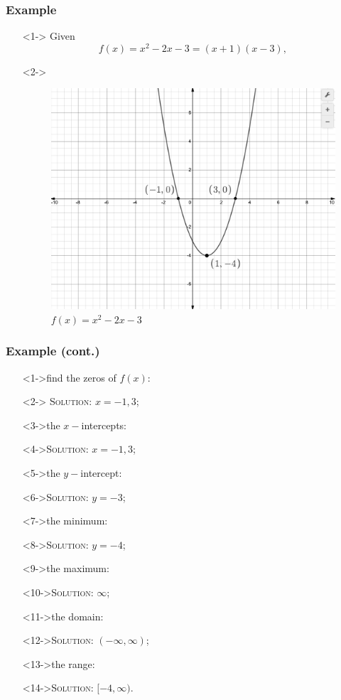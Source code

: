 \documentclass{beamer}
\begin{document}
\begin{frame}
	\frametitle{Example} 
	\begin{enumerate} 
		\item[]<1-> Given 
		\[
			f(x)=x^{2}-2x-3=(x+1)(x-3), 
		\]
		\item[]<2-> 
		\begin{figure} 
			\begin{center}
				\caption{$f(x)=x^{2}-2x-3$}
				\includegraphics[scale=0.2]{4_1_025.png} 	 	
			\end{center} 
		\end{figure} 
	\end{enumerate}
\end{frame}

\begin{frame}
	\frametitle{Example (cont.)} 
		\begin{enumerate}
			\item[]<1->find the zeros of $f(x)$: 
			\item[]<2-> \textsc{Solution:} $x=-1, 3$; 
			\item[]<3->the $x-$intercepts: 
			\item[]<4->\textsc{Solution:} $x=-1, 3$;  
			\item[]<5->the $y-$intercept: 
			\item[]<6->\textsc{Solution:} $y=-3$;  
			\item[]<7->the minimum:  
			\item[]<8->\textsc{Solution:} $y=-4$;  
			\item[]<9->the maximum: 
			\item[]<10->\textsc{Solution:} $\infty$;  
			\item[]<11->the domain: 
			\item[]<12->\textsc{Solution:} $(-\infty, \infty)$;  
			\item[]<13->the range: 
			\item[]<14->\textsc{Solution:} $[-4, \infty)$.  
		\end{enumerate}
\end{frame}
\end{document}
